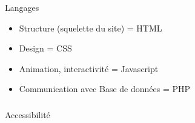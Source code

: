 \documentclass[11pt]{beamer}
\begin{document}
\begin{frame}
	\frametitle{\secname}
	\begin{block}{Langages}
		\begin{itemize}
		\item Structure (squelette du site) = HTML
\item Design = CSS
\item Animation, interactivité = Javascript
\item Communication avec Base de données = PHP

		\end{itemize}
	\end{block}
\end{frame}

\begin{frame}
	\frametitle{\secname}
	\begin{block}{Accessibilité}
	\end{block}
\end{frame}
\end{document}
